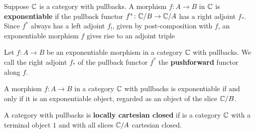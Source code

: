 \begin{definition}
  \label{defn:exponentiable-morphism}
  \leanok
    Suppose $\mathbb{C}$ is a category with pullbacks.
    A morphism $f \colon A \to B$ in $\mathbb{C}$ is \textbf{exponentiable} if the pullback functor
    $f^* \colon \mathbb{C} / B \to \mathbb{C} / A$ has a right adjoint $f_*$.
    Since $f^*$ always has a left adjoint $f_!$, given by post-composition with $f$, an
    exponentiable morphism $f$ gives rise to an adjoint triple
    \begin{center}\end{center}
\end{definition}

\begin{definition}
  \label{rmk:pushforward}
  \leanok
  Let $f \colon A \to B$ be an exponentiable morphism in a category $\mathbb{C}$ with pullbacks.
  We call the right adjoint $f_*$ of the pullback functor $f^*$ the \textbf{pushforward} functor
  along $f$.
\end{definition}

\begin{theorem}\label{thm:exponentiable-mor-exponentiable-obj}
  \leanok
  A morphism $f \colon A \to B$ in a category $\mathbb{C}$ with pullbacks is exponentiable if and only if
  it is an exponentiable object, regarded as an object of the slice $\mathbb{C} / B$.
\end{theorem}


\begin{definition}\label{defn:LCCC}
 \leanok
  A category with pullbacks is \textbf{locally cartesian closed} if
  is a category $\mathbb{C}$ with a terminal object $1$ and with all slices $\mathbb{C} / A$ cartesian closed.
\end{definition}
